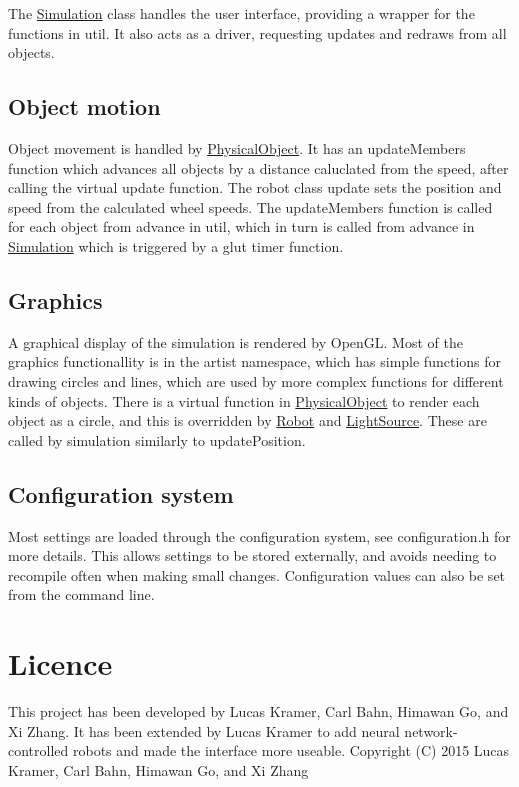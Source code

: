 The \hyperlink{classSimulation}{Simulation} class handles the user interface, providing a wrapper for the functions in util. It also acts as a driver, requesting updates and redraws from all objects. \hypertarget{index_Motion}{}\subsection{Object motion}\label{index_Motion}
Object movement is handled by \hyperlink{classPhysicalObject}{Physical\-Object}. It has an update\-Members function which advances all objects by a distance caluclated from the speed, after calling the virtual update function. The robot class update sets the position and speed from the calculated wheel speeds. The update\-Members function is called for each object from advance in util, which in turn is called from advance in \hyperlink{classSimulation}{Simulation} which is triggered by a glut timer function. \hypertarget{index_Graphics}{}\subsection{Graphics}\label{index_Graphics}
A graphical display of the simulation is rendered by Open\-G\-L. Most of the graphics functionallity is in the artist namespace, which has simple functions for drawing circles and lines, which are used by more complex functions for different kinds of objects. There is a virtual function in \hyperlink{classPhysicalObject}{Physical\-Object} to render each object as a circle, and this is overridden by \hyperlink{classRobot}{Robot} and \hyperlink{classLightSource}{Light\-Source}. These are called by simulation similarly to update\-Position. \hypertarget{index_Configuration}{}\subsection{Configuration system}\label{index_Configuration}
Most settings are loaded through the configuration system, see configuration.\-h for more details. This allows settings to be stored externally, and avoids needing to recompile often when making small changes. Configuration values can also be set from the command line.\hypertarget{index_Licence}{}\section{Licence}\label{index_Licence}
This project has been developed by Lucas Kramer, Carl Bahn, Himawan Go, and Xi Zhang. It has been extended by Lucas Kramer to add neural network-\/controlled robots and made the interface more useable. Copyright (C) 2015 Lucas Kramer, Carl Bahn, Himawan Go, and Xi Zhang

